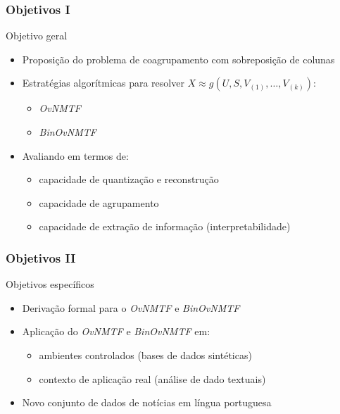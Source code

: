\documentclass[10pt]{beamer}
\begin{document}
\begin{frame}
\frametitle{Objetivos I}
  \begin{block}{Objetivo geral}
    \begin{itemize}
      \item Proposição do problema de coagrupamento com sobreposição de colunas
      \item Estratégias algorítmicas para resolver $X \approx g(U, S, V_{(1)}, \dots, V_{(k)})$:
    \begin{itemize}
      \item \textit{OvNMTF}
      \item \textit{BinOvNMTF}
    \end{itemize}
    \item Avaliando em termos de:
    \begin{itemize}
      \item capacidade de quantização e reconstrução
      \item capacidade de agrupamento
      \item capacidade de extração de informação (interpretabilidade)
    \end{itemize}
    \end{itemize}

  \end{block}
\end{frame}


\begin{frame}
  \frametitle{Objetivos II}

  \begin{block}{Objetivos específicos}
    \begin{itemize}
      \item Derivação formal para o \textit{OvNMTF} e \textit{BinOvNMTF}
      \item Aplicação do \textit{OvNMTF} e \textit{BinOvNMTF} em:
      \begin{itemize}
        \item ambientes controlados (bases de dados sintéticas)
        \item contexto de aplicação real (análise de dado textuais)
      \end{itemize}
      \item Novo conjunto de dados de notícias em língua portuguesa
    \end{itemize}

  \end{block}
\end{frame}
\end{document}
